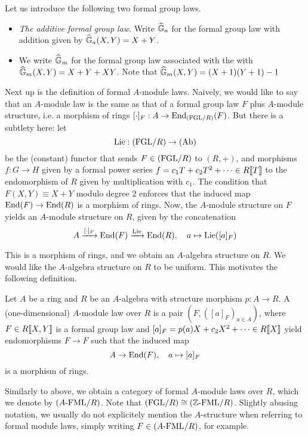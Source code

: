 \documentclass[../main.tex]{subfiles}
\begin{document}
\begin{xpl} Let us introduce the following two formal group laws.
  \begin{itemize}
    \item \textit{The additive formal group law}. Write 
      $\widehat{\mathbb{G}}_a$ for the formal group law with addition given by 
      $\widehat{\mathbb{G}}_a(X,Y) = X + Y$. 
    \item We write $\widehat{\mathbb{G}}_m$ for the formal group law associated with the 
      with $\widehat{\mathbb{G}}_m(X,Y) = X + Y + XY$. Note that $\widehat{\mathbb{G}}_m(X,Y) = (X+1)(Y+1) - 1$
  \end{itemize}
\end{xpl}

Next up is the definition of formal $A$-module laws. Naively, we would like to say
that an $A$-module law is the same as that of a formal group law $F$
plus $A$-module structure, i.e. a morphism of rings $[\cdot]_F: A \to
\operatorname{End}_{(\mathrm{FGL}/{R})}(F)$. But there is a subtlety here: let 
\begin{equation*}
  \operatorname{Lie}: {(\mathrm{FGL}/{R})} \to {(\mathrm{Ab})} 
\end{equation*}
be the (constant) functor that sends $F \in {(\mathrm{FGL}/{R})}$ to $(R,+)$, and morphisms
$f: G \to H$ given by a formal power series
$f = c_1 T + c_2 T^2 + \dots \in R\llbracket T \rrbracket$ to the endomorphism
of $R$ given by multiplication with $c_1$. The condition that 
$F(X,Y) \equiv X+Y$ modulo degree $2$ enforces that the induced map
$\operatorname{End}(F) \to \operatorname{End}(R)$ is a morphism of rings. Now, the $A$-module structure on $F$ 
yields an $A$-module structure on $R$, given by the concatenation\begin{equation*}
  A \xrightarrow{[\cdot]_F} \operatorname{End}(F) \xrightarrow{\operatorname{Lie}} \operatorname{End}(R), \quad a \mapsto \operatorname{Lie}([a]_F)
\end{equation*}

This is a morphism of rings, and we obtain an $A$-algebra structure on $R$. We would
like the $A$-algebra structure on $R$ to be uniform. This
motivates the following definition.
\begin{defi}
  Let $A$ be a ring and $R$ be an $A$-algebra with structure
  morphism $p: A \to R$. A (one-dimensional) $A$-module law over $R$ is a
  pair $(F, ([a]_F)_{a \in A})$, where $F \in R\llbracket X,Y \rrbracket$ is 
  a formal group law and $[a]_F = p(a)X + c_2X^2 + \dots 
  \in R\llbracket X \rrbracket$ yield endomorphisms $F \to F$ such that the induced map
  \begin{equation*}
    A \to \operatorname{End}(F), \quad a \mapsto [a]_F 
  \end{equation*}
  is a morphism of rings.
\end{defi}
Similarly to above, we obtain a category of formal $A$-module laws over $R$,
which we denote by ${({A}\text-\mathrm{FML}/{R})}$. Note that ${(\mathrm{FGL}/{R})} \cong {({\mathbb{Z}}\text-\mathrm{FML}/{R})}$.
Slightly abusing notation, we usually do not explicitely mention the $A$-structure
when referring to formal module laws, simply writing $F \in {({A}\text-\mathrm{FML}/{R})}$, for
example. 
\end{document}
